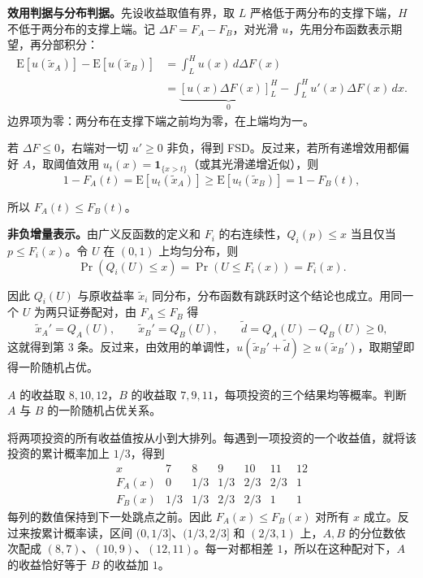 \begin{solution}[label-content={证明},blank-type=none]
\textbf{效用判据与分布判据。}先设收益取值有界，取 $L$ 严格低于两分布的支撑下端，$H$ 不低于两分布的支撑上端。记 $\Delta F=F_A-F_B$，对光滑 $u$，先用分布函数表示期望，再分部积分：
\[
\begin{aligned}
 \mathrm E[u(\tilde x_A)]-\mathrm E[u(\tilde x_B)]
 &=\int_L^H u(x)\,d\Delta F(x)\\
 &=\underbrace{[u(x)\Delta F(x)]_L^H}_{0}
   -\int_L^H u'(x)\Delta F(x)\,dx.
\end{aligned}
\]
边界项为零：两分布在支撑下端之前均为零，在上端均为一。

若 $\Delta F\le0$，右端对一切 $u'\ge0$ 非负，得到 FSD。反过来，若所有递增效用都偏好 $A$，取阈值效用 $u_t(x)=\mathbf1_{\{x>t\}}$（或其光滑递增近似），则
\[
 1-F_A(t)=\mathrm E[u_t(\tilde x_A)]
 \ge\mathrm E[u_t(\tilde x_B)]=1-F_B(t),
\]

所以 $F_A(t)\le F_B(t)$。

\textbf{非负增量表示。}由广义反函数的定义和 $F_i$ 的右连续性，$Q_i(p)\le x$ 当且仅当 $p\le F_i(x)$。令 $U$ 在 $(0,1)$ 上均匀分布，则
\[
 \Pr(Q_i(U)\le x)=\Pr(U\le F_i(x))=F_i(x).
\]

因此 $Q_i(U)$ 与原收益率 $\tilde x_i$ 同分布，分布函数有跳跃时这个结论也成立。用同一个 $U$ 为两只证券配对，由 $F_A\le F_B$ 得
\[
 \tilde x_A'=Q_A(U),\qquad \tilde x_B'=Q_B(U),\qquad
 \tilde d=Q_A(U)-Q_B(U)\ge0,
\]
这就得到第 3 条。反过来，由效用的单调性，$u(\tilde x_B'+\tilde d)\ge u(\tilde x_B')$，取期望即得一阶随机占优。
\end{solution}

\begin{tcolorbox}[example,title={课堂例题：从阶梯分布函数读出一阶随机占优}]
$A$ 的收益取 $8,10,12$，$B$ 的收益取 $7,9,11$，每项投资的三个结果均等概率。判断 $A$ 与 $B$ 的一阶随机占优关系。

将两项投资的所有收益值按从小到大排列。每遇到一项投资的一个收益值，就将该投资的累计概率加上 $1/3$，得到
\[
\begin{array}{c|cccccc}
x & 7 & 8 & 9 & 10 & 11 & 12\\ \hline
F_A(x) & 0 & 1/3 & 1/3 & 2/3 & 2/3 & 1\\
F_B(x) & 1/3 & 1/3 & 2/3 & 2/3 & 1 & 1
\end{array}
\]
每列的数值保持到下一处跳点之前。因此 $F_A(x)\le F_B(x)$ 对所有 $x$ 成立。反过来按累计概率读，区间 $(0,1/3]$、$(1/3,2/3]$ 和 $(2/3,1)$ 上，$A,B$ 的分位数依次配成 $(8,7)$、$(10,9)$、$(12,11)$。每一对都相差 $1$，所以在这种配对下，$A$ 的收益恰好等于 $B$ 的收益加 $1$。
\end{tcolorbox}

